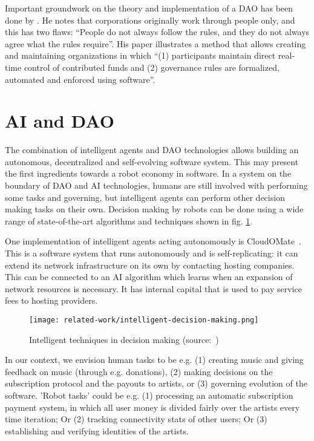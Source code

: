 Important groundwork on the theory and implementation of a DAO has been done by \cite{jentzsch2016decentralized}. He notes that corporations originally work through people only, and this has two flaws: ``People do not always follow the rules, and they do not always agree what the rules require''. His paper illustrates a method that allows creating and maintaining organizations in which ``(1) participants maintain direct real-time control of contributed funds and (2) governance rules are formalized, automated and enforced using software''.

\section{AI and DAO}
The combination of intelligent agents and DAO technologies allows building an autonomous, decentralized and self-evolving software system. This may present the first ingredients towards a robot economy in software. In a system on the boundary of DAO and AI technologies, humans are still involved with performing some tasks and governing, but intelligent agents can perform other decision making tasks on their own. Decision making by robots can be done using a wide range of state-of-the-art algorithms and techniques shown in fig. \ref{fig:ai-techniques}.

One implementation of intelligent agents acting autonomously is CloudOMate~\citep{jaspers2018plebnet}. This is a software system that runs autonomously and is self-replicating: it can extend its network infrastructure on its own by contacting hosting companies. This can be connected to an AI algorithm which learns when an expansion of network resources is necessary. It has internal capital that is used to pay service fees to hosting providers.

\begin{figure}
    \centering
    \texttt{[image: related-work/intelligent-decision-making.png]}
    \caption{Intelligent techniques in decision making (source:~\cite{das2016intelligent})}
    \label{fig:ai-techniques}
\end{figure}

In our context, we envision human tasks to be e.g. (1) creating music and giving feedback on music (through e.g. donations), (2) making decisions on the subscription protocol and the payouts to artists, or (3) governing evolution of the software. 'Robot tasks' could be e.g. (1) processing an automatic subscription payment system, in which all user money is divided fairly over the artists every time iteration; Or (2) tracking connectivity stats of other users; Or (3) establishing and verifying identities of the artists.

